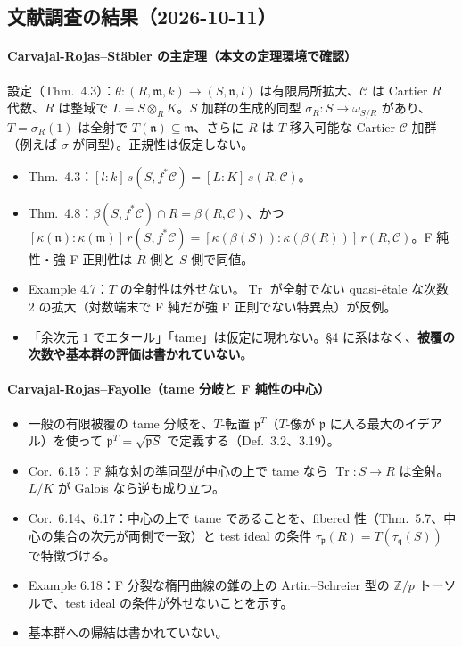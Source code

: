 \documentclass[11pt,a4paper]{ltjsarticle}
\theoremstyle{plain}
\theoremstyle{definition}
\theoremstyle{remark}
\theoremstyle{plain}
\newcommand{\m}{\mathfrak{m}}
\newcommand{\n}{\mathfrak{n}}
\newcommand{\Tr}{\operatorname{Tr}}
\begin{document}
\subsection{文献調査の結果（2026-10-11）}

\paragraph{Carvajal-Rojas--Stäbler の主定理（本文の定理環境で確認）}
設定（Thm.~4.3）：$\theta\colon(R,\m,k)\to(S,\n,l)$ は有限局所拡大、$\mathscr{C}$ は Cartier $R$ 代数、$R$ は整域で $L = S\otimes_R K$。$S$ 加群の生成的同型 $\sigma_R\colon S\to\omega_{S/R}$ があり、$T = \sigma_R(1)$ は全射で $T(\n)\subseteq\m$、さらに $R$ は $T$ 移入可能な Cartier $\mathscr{C}$ 加群（例えば $\sigma$ が同型）。正規性は仮定しない。
\begin{itemize}
  \item Thm.~4.3：$[l:k]\,s(S,f^*\mathscr{C}) = [L:K]\,s(R,\mathscr{C})$。
  \item Thm.~4.8：$\beta(S,f^*\mathscr{C})\cap R = \beta(R,\mathscr{C})$、かつ $[\kappa(\n):\kappa(\m)]\,r(S,f^*\mathscr{C}) = [\kappa(\beta(S)):\kappa(\beta(R))]\,r(R,\mathscr{C})$。F 純性・強 F 正則性は $R$ 側と $S$ 側で同値。
  \item Example 4.7：$T$ の全射性は外せない。$\Tr$ が全射でない quasi-étale な次数 $2$ の拡大（対数端末で F 純だが強 F 正則でない特異点）が反例。
  \item 「余次元 $1$ でエタール」「tame」は仮定に現れない。§4 に系はなく、\textbf{被覆の次数や基本群の評価は書かれていない}。
\end{itemize}

\paragraph{Carvajal-Rojas--Fayolle（tame 分岐と F 純性の中心）}
\begin{itemize}
  \item 一般の有限被覆の tame 分岐を、$T$-転置 $\mathfrak{p}^T$（$T$-像が $\mathfrak{p}$ に入る最大のイデアル）を使って $\mathfrak{p}^T = \sqrt{\mathfrak{p}S}$ で定義する（Def.~3.2、3.19）。
  \item Cor.~6.15：F 純な対の準同型が中心の上で tame なら $\Tr\colon S\to R$ は全射。$L/K$ が Galois なら逆も成り立つ。
  \item Cor.~6.14、6.17：中心の上で tame であることを、fibered 性（Thm.~5.7、中心の集合の次元が両側で一致）と test ideal の条件 $\tau_{\mathfrak{p}}(R) = T(\tau_{\mathfrak{q}}(S))$ で特徴づける。
  \item Example 6.18：F 分裂な楕円曲線の錐の上の Artin--Schreier 型の $\mathbb{Z}/p$ トーソルで、test ideal の条件が外せないことを示す。
  \item 基本群への帰結は書かれていない。
\end{itemize}
\end{document}
